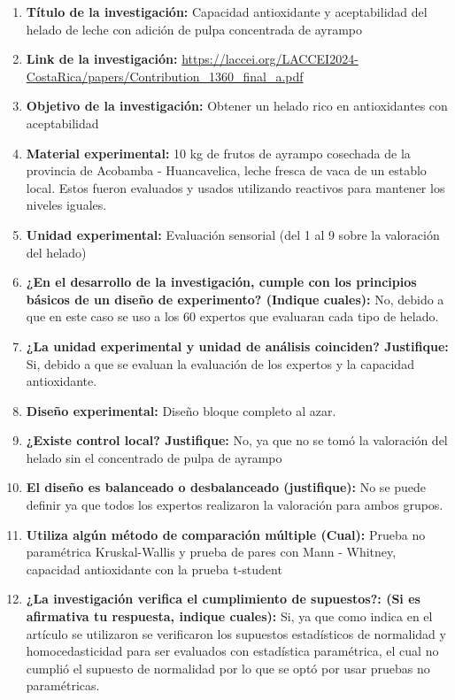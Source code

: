 \begin{enumerate}
	\item \textbf{Título de la investigación:} Capacidad antioxidante y aceptabilidad del helado de leche con adición de pulpa concentrada de ayrampo
	\item \textbf{Link de la investigación:} \url{https://laccei.org/LACCEI2024-CostaRica/papers/Contribution_1360_final_a.pdf}
	\item \textbf{Objetivo de la investigación:} Obtener un helado rico en antioxidantes con aceptabilidad
	\item \textbf{Material experimental:} 10 kg de frutos de ayrampo cosechada de la provincia de Acobamba - Huancavelica, leche fresca de vaca de un establo local. Estos fueron evaluados y usados utilizando reactivos para mantener los niveles iguales.
	\item \textbf{Unidad experimental:} Evaluación sensorial (del 1 al 9 sobre la valoración del helado)
	\item \textbf{¿En el desarrollo de la investigación, cumple con los principios básicos de un diseño de experimento? (Indique cuales):} No, debido a que en este caso se uso a los 60 expertos que evaluaran cada tipo de helado.
	\item \textbf{¿La unidad experimental y unidad de análisis coinciden? Justifique:} Si, debido a que se evaluan la evaluación de los expertos y la capacidad antioxidante.
	\item \textbf{Diseño experimental:} Diseño bloque completo al azar.
	\item \textbf{¿Existe control local? Justifique:} No, ya que no se tomó la valoración del helado sin el concentrado de pulpa de ayrampo
	\item \textbf{El diseño es balanceado o desbalanceado (justifique):} No se puede definir ya que todos los expertos realizaron la valoración para ambos grupos.
	\item \textbf{Utiliza algún método de comparación múltiple (Cual):} Prueba no paramétrica Kruskal-Wallis y prueba de pares con Mann - Whitney, capacidad antioxidante con la prueba t-student
	\item \textbf{¿La investigación verifica el cumplimiento de supuestos?: (Si es afirmativa tu respuesta, indique cuales):} Si, ya que como indica en el artículo se utilizaron se verificaron los supuestos estadísticos de normalidad y homocedasticidad para ser evaluados con estadística paramétrica, el cual no cumplió el supuesto de normalidad por lo que se optó por usar pruebas no paramétricas.
\end{enumerate}

